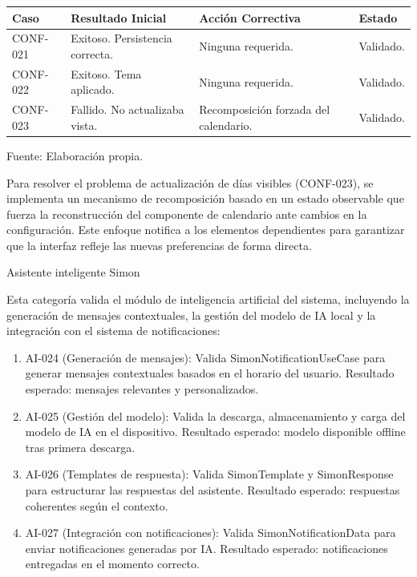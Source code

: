   \begin{center}
  \begin{minipage}{\linewidth}
  \centering
  \begin{tabularx}{\linewidth}{@{}>{\RaggedRight\arraybackslash}p{2.0cm}>{\RaggedRight\arraybackslash}X>{\RaggedRight\arraybackslash}X>{\RaggedRight\arraybackslash}p{1.8cm}@{}}
  \toprule
  Caso & Resultado Inicial & Acción Correctiva & Estado \\
  \midrule
  CONF-021 & Exitoso. Persistencia correcta. & Ninguna requerida. & Validado. \\
  \addlinespace
  CONF-022 & Exitoso. Tema aplicado. & Ninguna requerida. & Validado. \\
  \addlinespace
  CONF-023 & Fallido. No actualizaba vista. & Recomposición forzada del calendario. & Validado. \\
  \bottomrule
  \end{tabularx}
  \label{tab:qa_config}
  Fuente: Elaboración propia.
  \end{minipage}
  \end{center}
  
  Para resolver el problema de actualización de días visibles (CONF-023), se implementa un mecanismo de recomposición basado en un estado observable que fuerza la reconstrucción del componente de calendario ante cambios en la configuración. Este enfoque notifica a los elementos dependientes para garantizar que la interfaz refleje las nuevas preferencias de forma directa.
  
  \item Asistente inteligente Simon
  
  Esta categoría valida el módulo de inteligencia artificial del sistema, incluyendo la generación de mensajes contextuales, la gestión del modelo de IA local y la integración con el sistema de notificaciones:
  
  \begin{enumerate}[label=\alph*)]
    \item AI-024 (Generación de mensajes): Valida SimonNotificationUseCase para generar mensajes contextuales basados en el horario del usuario. Resultado esperado: mensajes relevantes y personalizados.
    
    \item AI-025 (Gestión del modelo): Valida la descarga, almacenamiento y carga del modelo de IA en el dispositivo. Resultado esperado: modelo disponible offline tras primera descarga.
    
    \item AI-026 (Templates de respuesta): Valida SimonTemplate y SimonResponse para estructurar las respuestas del asistente. Resultado esperado: respuestas coherentes según el contexto.
    
    \item AI-027 (Integración con notificaciones): Valida SimonNotificationData para enviar notificaciones generadas por IA. Resultado esperado: notificaciones entregadas en el momento correcto.
  \end{enumerate}
  
